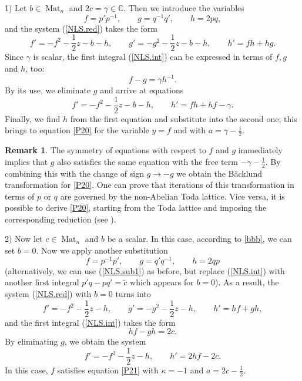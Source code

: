 \documentclass{article}
\theoremstyle{plain}
\theoremstyle{definition}
\newtheorem{remark}{Remark}
\DeclareMathOperator{\Mat}{Mat}
\begin{document}
1) Let $b\in\Mat_n$ and $2c=\gamma\in\mathbb C$. Then we introduce the variables
\begin{equation}\label{NLS.sub1}
 f=p'p^{-1},\qquad g=q^{-1}q',\qquad h=2pq,
\end{equation}
and the system (\ref{NLS.red}) takes the form
\[
 f'=-f^2-\frac{1}{2}z-b-h,\qquad g'=-g^2-\frac{1}{2}z-b-h,\qquad h'=fh+hg.
\]
Since $\gamma$ is scalar, the first integral (\ref{NLS.int}) can be expressed in terms of $f,g$ and $h$, too:
\[
 f-g=\gamma h^{-1}.
\]  
By its use, we eliminate $g$ and arrive at equations
\begin{equation}\label{fh0}
 f'=-f^2-\frac{1}{2}z-b-h,\qquad h'=fh+hf-\gamma.
\end{equation}
Finally, we find $h$ from the first equation and substitute into the second one; this brings to equation \ref{P20} for the variable $y=f$ and with $a=\gamma-\frac{1}{2}$. 

\begin{remark} 
The symmetry of equations with respect to $f$ and $g$ immediately implies that $g$ also satisfies the same equation with the free term $-\gamma-\frac{1}{2}$. By combining this with the change of sign $g\to -g$ we obtain the B\"acklund transformation for \ref{P20}. One can prove that iterations of this transformation in terms of $p$ or $q$ are governed by the non-Abelian Toda lattice. Vice versa, it is possible to derive \ref{P20}, starting from the Toda lattice and imposing the corresponding reduction (see \cite{Retakh_Rubtsov_2010}). 
\end{remark} 


2) Now let $c\in\Mat_n$ and $b$ be a scalar. In this case, according to \eqref{bbb}, we can set $b=0$. Now we apply another substitution
\begin{equation}\label{NLS.sub2}
 f=p^{-1}p',\qquad g=q'q^{-1},\qquad h=2qp
\end{equation}
(alternatively, we can use (\ref{NLS.sub1}) as before, but replace (\ref{NLS.int}) with another first integral $p'q-pq'=\tilde c$ which appears for $b=0$). As a result, the system (\ref{NLS.red}) with $b=0$ turns into
\[
 f'=-f^2-\frac{1}{2}z-h,\qquad g'=-g^2-\frac{1}{2}z-h,\qquad h'=hf+gh,
\]
and the first integral (\ref{NLS.int}) takes the form
\[
 hf-gh=2c.
\]  
By eliminating $g$, we obtain the system
\begin{equation}\label{fh1}
 f'=-f^2-\frac{1}{2}z-h,\qquad h'=2hf-2c.
\end{equation}
In this case, $f$ satisfies equation \ref{P21} with $\kappa=-1$ and $a=2c-\frac{1}{2}$.
\end{document}
